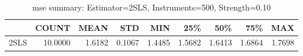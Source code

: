 \begin{table}[ht]
\centering
\caption{mse summary: Estimator=2SLS, Instruments=500, Strength=0.10}
\begin{tabular}{lrrrrrrrr}
\toprule
 & COUNT & MEAN & STD & MIN & 25\% & 50\% & 75\% & MAX \\
\midrule
2SLS & 10.0000 & 1.6182 & 0.1067 & 1.4485 & 1.5682 & 1.6413 & 1.6864 & 1.7698 \\
\bottomrule
\end{tabular}
\end{table}
